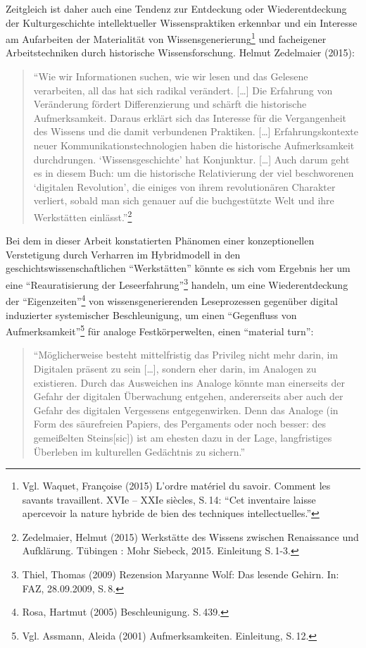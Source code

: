 \documentclass[a4paper,
fontsize=11pt,
oneside,
numbers=noperiodatend,
parskip=half-,
bibliography=totoc,
final
]{scrartcl}
\begin{document}
Zeitgleich ist daher auch eine Tendenz zur Entdeckung oder
Wiederentdeckung der Kulturgeschichte intellektueller Wissenspraktiken
erkennbar und ein Interesse am Aufarbeiten der Materialität von
Wissensgenerierung\footnote{Vgl. Waquet, Françoise (2015) L'ordre
  matériel du savoir. Comment les savants travaillent. XVIe -- XXIe
  siècles, S.\,14: \enquote{Cet inventaire laisse apercevoir la nature
  hybride de bien des techniques intellectuelles.}} und facheigener
Arbeitstechniken durch historische Wissensforschung. Helmut Zedelmaier
(2015):

\begin{quote}
\enquote{Wie wir Informationen suchen, wie wir lesen und das Gelesene
verarbeiten, all das hat sich radikal verändert. {[}\ldots{}{]} Die
Erfahrung von Veränderung fördert Differenzierung und schärft die
historische Aufmerksamkeit. Daraus erklärt sich das Interesse für die
Vergangenheit des Wissens und die damit verbundenen Praktiken.
{[}\ldots{}{]} Erfahrungskontexte neuer Kommunikationstechnologien haben
die historische Aufmerksamkeit durchdrungen. \enquote{Wissensgeschichte}
hat Konjunktur. {[}\ldots{}{]} Auch darum geht es in diesem Buch: um die
historische Relativierung der viel beschworenen \enquote{digitalen
Revolution}, die einiges von ihrem revolutionären Charakter verliert,
sobald man sich genauer auf die buchgestützte Welt und ihre Werkstätten
einlässt.}\footnote{Zedelmaier, Helmut (2015) Werkstätte des Wissens
  zwischen Renaissance und Aufklärung. Tübingen : Mohr Siebeck, 2015.
  Einleitung S.\,1-3.}
\end{quote}

Bei dem in dieser Arbeit konstatierten Phänomen einer konzeptionellen
Verstetigung durch Verharren im Hybridmodell in den
geschichtswissenschaftlichen \enquote{Werkstätten} könnte es sich vom
Ergebnis her um eine \enquote{Reauratisierung der
Leseerfahrung}\footnote{Thiel, Thomas (2009) Rezension Maryanne Wolf:
  Das lesende Gehirn. In: FAZ, 28.09.2009, S.\,8.} handeln, um eine
Wiederentdeckung der \enquote{Eigenzeiten}\footnote{Rosa, Hartmut (2005)
  Beschleunigung. S.\,439.} von wissensgenerierenden Leseprozessen
gegenüber digital induzierter systemischer Beschleunigung, um einen
\enquote{Gegenfluss von Aufmerksamkeit}\footnote{Vgl. Assmann, Aleida
  (2001) Aufmerksamkeiten. Einleitung, S.\,12.} für analoge
Festkörperwelten, einen \enquote{material turn}:

\begin{quote}
\enquote{Möglicherweise besteht mittelfristig das Privileg nicht mehr
darin, im Digitalen präsent zu sein {[}\ldots{}{]}, sondern eher darin,
im Analogen zu existieren. Durch das Ausweichen ins Analoge könnte man
einerseits der Gefahr der digitalen Überwachung entgehen, andererseits
aber auch der Gefahr des digitalen Vergessens entgegenwirken. Denn das
Analoge (in Form des säurefreien Papiers, des Pergaments oder noch
besser: des gemeißelten Steins{[}sic{]}) ist am ehesten dazu in der
Lage, langfristiges Überleben im kulturellen Gedächtnis zu sichern.}
\end{quote}
\end{document}

